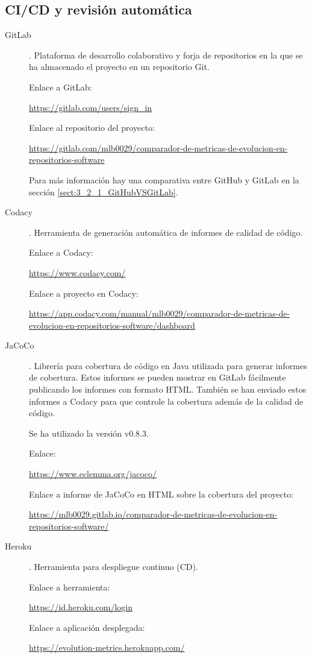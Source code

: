\subsection{CI/CD y revisión automática}
\begin{description}
	\item[GitLab]. Plataforma de desarrollo colaborativo y forja de repositorios en la que se ha almacenado el proyecto en un repositorio Git.
	
		Enlace a GitLab:
		
		\url{https://gitlab.com/users/sign_in}
		
		Enlace al repositorio del proyecto:
		
		\href{https://gitlab.com/mlb0029/comparador-de-metricas-de-evolucion-en-repositorios-software}{https://gitlab.com/mlb0029/comparador-de-metricas-de-evolucion-en-repositorios-software}
		
		Para más información hay una comparativa entre GitHub y GitLab en la sección \ref{sect:3_2_1_GitHubVSGitLab}.
		
	\item[Codacy]. Herramienta de generación automática de informes de calidad de código.
	
		 Enlace a Codacy:
		 
		 \url{https://www.codacy.com/}
		 
		 Enlace a proyecto en Codacy: 
		 
		 \href{https://app.codacy.com/manual/mlb0029/comparador-de-metricas-de-evolucion-en-repositorios-software/dashboard}{https://app.codacy.com/manual/mlb0029/comparador-de-metricas-de-evolucion-en-repositorios-software/dashboard}
	
	\item[JaCoCo]. Librería para cobertura de código en Java utilizada para generar informes de cobertura. Estos informes se pueden mostrar en GitLab fácilmente publicando los informes con formato HTML. También se han enviado estos informes a Codacy para que controle la cobertura además de la calidad de código.
	
		Se ha utilizado la versión v0.8.3.
		
		Enlace:
		
		\url{https://www.eclemma.org/jacoco/}
		
		Enlace a informe de JaCoCo en HTML sobre la cobertura del proyecto:
		
		\href{https://mlb0029.gitlab.io/comparador-de-metricas-de-evolucion-en-repositorios-software/}{https://mlb0029.gitlab.io/comparador-de-metricas-de-evolucion-en-repositorios-software/}
	
	\item[Heroku]. Herramienta para despliegue continuo (CD).
	
		Enlace a herramienta:
		
		\url{https://id.heroku.com/login}
		
		Enlace a aplicación desplegada:
		
		\url{https://evolution-metrics.herokuapp.com/}
	
\end{description}
